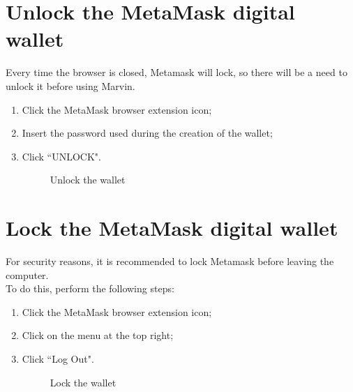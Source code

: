 \documentclass[ManualeUtente]{subfiles}
\begin{document}
\section{Unlock the MetaMask digital wallet}
Every time the browser is closed, Metamask will lock, so there will be a need to unlock it before using Marvin.
\begin{enumerate}
	\item Click the MetaMask browser extension icon;
	\item Insert the password used during the creation of the wallet;
	\item Click \textquotedblleft UNLOCK".
	\begin{figure}[H]
		\centering
		\caption{Unlock the wallet}
		\label{fig:Unlock the wallet}
	\end{figure}
\end{enumerate}

\section{Lock the MetaMask digital wallet}
For security reasons, it is recommended to lock Metamask before leaving the computer. \\
To do this, perform the following steps:
\begin{enumerate}
	\item Click the MetaMask browser extension icon;
	\item Click on the menu at the top right;
	\item Click \textquotedblleft Log Out".
	\begin{figure}[H]
		\centering
		\caption{Lock the wallet}
		\label{fig:Lock the wallet}
	\end{figure}
\end{enumerate}
\end{document}
